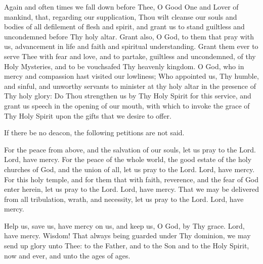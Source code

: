 \begin{semisecret}
    \begin{secretprayerbasil}
        Again and often times we fall down before Thee, O Good One and Lover of mankind, that, regarding our supplication, Thou wilt cleanse our souls and bodies of all defilement of flesh and spirit, and grant us to stand guiltless and uncondemned before Thy holy altar. Grant also, O God, to them that pray with us, advancement in life and faith and spiritual understanding. Grant them ever to serve Thee with fear and love, and to partake, guiltless and uncondemned, of thy Holy Mysteries, and to be vouchsafed Thy heavenly kingdom.
        \switchcolumn
        O God, who in mercy and compassion hast visited our lowliness; Who appointed us, Thy humble, and sinful, and unworthy servants to minister at thy holy altar in the presence of Thy holy glory: Do Thou strengthen us by Thy Holy Spirit for this service, and grant us speech in the opening of our mouth, with which to invoke the grace of Thy Holy Spirit upon the gifts that we desire to offer.
    \end{secretprayerbasil}
\end{semisecret}

\begin{rubricsection}
    \begin{rubricmed}
        If there be no deacon, the following petitions are not said.
    \end{rubricmed}
    \begin{liturgicaltext}
        \deacon For the peace from above, and the salvation of our souls, let us pray to the Lord.
        \choir Lord, have mercy.
        \deacon For the peace of the whole world, the good estate of the holy churches of God, and the union of all, let us pray to the Lord.
        \choir Lord, have mercy.
        \deacon For this holy temple, and for them that with faith, reverence, and the fear of God enter herein, let us pray to the Lord.
        \choir Lord, have mercy.
        \deacon That we may be delivered from all tribulation, wrath, and necessity, let us pray to the Lord.
        \choir Lord, have mercy.
    \end{liturgicaltext}
\end{rubricsection}

\begin{liturgicaltext}
    \deacon Help us, save us, have mercy on us, and keep us, O God, by Thy grace.
    \choir Lord, have mercy.
    \deacon Wisdom!
    \priest That always being guarded under Thy dominion, we may send up glory unto Thee: to the Father, and to the Son and to the Holy Spirit, now and ever, and unto the ages of ages.
    \choir {}
\end{liturgicaltext}